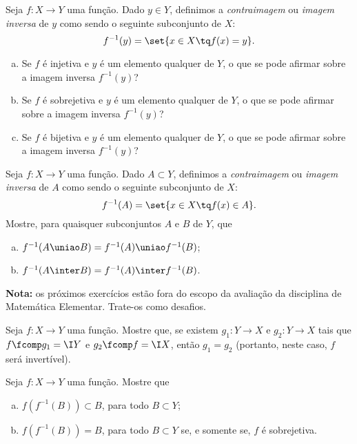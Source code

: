 \begin{exercise}
    Seja $f: X \to Y$ uma função. Dado $y \in Y$, definimos a
\emph{contraimagem} ou \emph{imagem inversa} de $y$ como sendo o
seguinte subconjunto de $X$: $$ f^{-1}(y) = \set{x \in X \tq
f(x)=y}.$$
\begin{enumerate}[(a)]
  \item Se $f$ é injetiva e $y$ é um elemento qualquer de $Y$, o que
  se pode afirmar sobre a imagem inversa $f^{-1}(y)$?
  \item Se $f$ é sobrejetiva e $y$ é um elemento qualquer de $Y$, o que
  se pode afirmar sobre a imagem inversa $f^{-1}(y)$?
  \item Se $f$ é bijetiva e $y$ é um elemento qualquer de $Y$, o que
  se pode afirmar sobre a imagem inversa $f^{-1}(y)$?
\end{enumerate}
\end{exercise}

\begin{exercise}
    Seja $f: X \to Y$ uma função. Dado $A \subset Y$, definimos a
\emph{contraimagem} ou \emph{imagem inversa} de $A$ como sendo o
seguinte subconjunto de $X$: $$ f^{-1}(A) = \set{x \in X \tq f(x)\in
A}.$$ Mostre, para quaisquer subconjuntos $A$ e $B$ de $Y$, que
\begin{enumerate}[(a)]
  \item $f^{-1} (A \uniao B) = f^{-1} (A) \uniao f^{-1} (B)$;
  \item $f^{-1} (A \inter B) = f^{-1} (A) \inter f^{-1} (B)$.
\end{enumerate}
\end{exercise}

\textbf{Nota:} os próximos exercícios estão fora do escopo da avaliação da disciplina de Matemática Elementar.
Trate-os como desafios.

\begin{challenge}
    Seja $f: X \to Y$ uma função. Mostre que, se existem $g_1 : Y
\to X$ e $g_2 : Y \to X$ tais que $f \fcomp g_1 = \I Y$ e $g_2 \fcomp
f = \I X$, então $g_1 = g_2$ (portanto, neste caso, $f$ será
invertível).
\end{challenge}

\begin{challenge}
    Seja $f: X \to Y$ uma função. Mostre que
\begin{enumerate}[(a)]
  \item $f(f^{-1}(B)) \subset B$, para todo $B \subset Y$;
  \item $f(f^{-1}(B)) = B$, para todo $B \subset Y$ se, e
  somente se, $f$ é sobrejetiva.
\end{enumerate}
\end{challenge}

